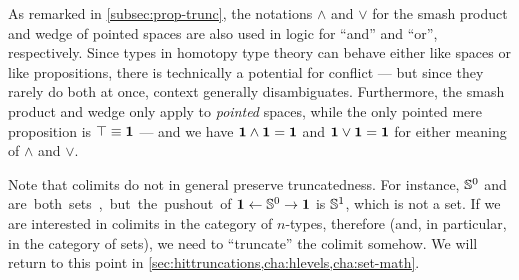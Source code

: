 \documentclass[hott-all.tex]{subfiles}
\begin{document}
% 
% 
% 
\begin{rmk}
  As remarked in \cref{subsec:prop-trunc}, the notations $\wedge$ and $\vee$ for the smash product and wedge of pointed spaces are also used in logic for ``and'' and ``or'', respectively.
  Since types in homotopy type theory can behave either like spaces or like propositions, there is technically a potential for conflict --- but since they rarely do both at once, context generally disambiguates.
  Furthermore, the smash product and wedge only apply to \emph{pointed} spaces, while the only pointed mere proposition is $\top\equiv\mathbf{1}$ --- and we have $\mathbf{1}\wedge \mathbf{1} = \mathbf{1}$ and $\mathbf{1}\vee\mathbf{1}=\mathbf{1}$ for either meaning of $\wedge$ and $\vee$.
\end{rmk}
% 
% 
\begin{rmk}
  Note that colimits do not in general preserve truncatedness.
  For instance, $\mathbb{S}^0$ and \unit are both sets, but the pushout of $\mathbf{1} \leftarrow \mathbb{S}^0 \to \mathbf{1}$ is $\mathbb{S}^1$, which is not a set.
  If we are interested in colimits in the category of $n$-types, therefore (and, in particular, in the category of sets), we need to ``truncate'' the colimit somehow.
  We will return to this point in \cref{sec:hittruncations,cha:hlevels,cha:set-math}.
\end{rmk}
% 
% 
\end{document}
